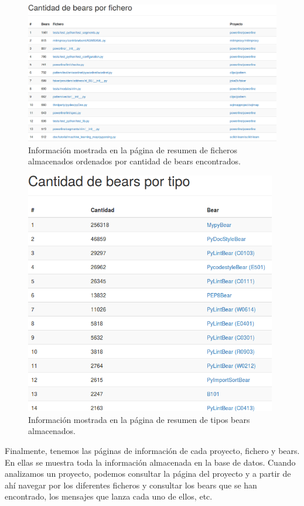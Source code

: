 \documentclass[a4paper, 12pt]{book}
\begin{document}
\begin{figure}[H]
  \centering
  \includegraphics[width=15cm, keepaspectratio]{img/resumenFicheros}
  \caption{Información mostrada en la página de resumen de ficheros almacenados ordenados por cantidad de bears encontrados.}
  \label{fig:resumenFicheros}
\end{figure}

\begin{figure}[H]
  \centering
  \includegraphics[width=11cm, keepaspectratio]{img/resumenBears}
  \caption{Información mostrada en la página de resumen de tipos bears almacenados.}
  \label{fig:resumenBears}
\end{figure}

Finalmente, tenemos las páginas de información de cada proyecto, fichero y bears. En ellas se muestra toda la información almacenada en la base de datos. Cuando analizamos un proyecto, podemos consultar la página del proyecto y a partir de ahí navegar por los diferentes ficheros y consultar los bears que se han encontrado, los mensajes que lanza cada uno de ellos, etc.
\end{document}

